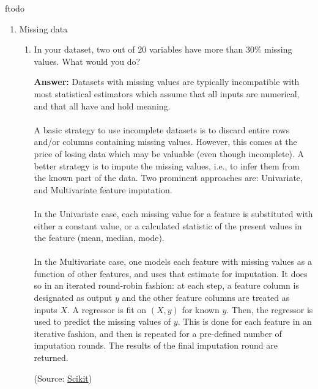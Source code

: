 ƒtodo\documentclass{article}
\newenvironment{QandA}{\begin{enumerate}[label=\arabic*.]}{\end{enumerate}}
\newenvironment{InnerQandA}{\begin{enumerate}[label=\roman*.]}{\end{enumerate}}
\newenvironment{answer}{\par\normalfont \textbf{Answer:}}{}
\begin{document}
\begin{QandA}
    \item Missing data
    \begin{InnerQandA}
        \item In your dataset, two out of 20 variables have more than 30\% missing values. What would you do?
        \begin{answer}
            Datasets with missing values are typically incompatible with most statistical estimators which assume that all inputs are numerical, and that all have and hold meaning. \\\\
            A basic strategy to use incomplete datasets is to discard entire rows and/or columns containing missing values. However, this comes at the price of losing data which may be valuable (even though incomplete). A better strategy is to impute the missing values, i.e., to infer them from the known part of the data. Two prominent approaches are: Univariate, and Multivariate feature imputation. \\\\
            In the Univariate case, each missing value for a feature is substituted with either a constant value, or a calculated statistic of the present values in the feature (mean, median, mode). \\\\
            In the Multivariate case, one models each feature with missing values as a function of other features, and uses that estimate for imputation. It does so in an iterated round-robin fashion: at each step, a feature column is designated as output $y$ and the other feature columns are treated as inputs $X$. A regressor is fit on $(X, y)$ for known $y$. Then, the regressor is used to predict the missing values of $y$. This is done for each feature in an iterative fashion, and then is repeated for a pre-defined number of imputation rounds. The results of the final imputation round are returned.

            (Source: \href{https://scikit-learn.org/stable/modules/impute.html}{Scikit})
        \end{answer}


\end{InnerQandA}
\end{QandA}
\end{document}
